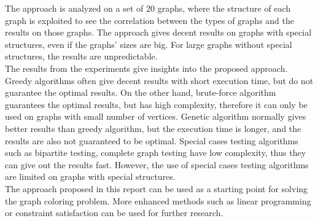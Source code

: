 \documentclass[a4paper]{report}
\begin{document}
	The approach is analyzed on a set of 20 graphs, where the structure of each graph is exploited to see the correlation between the types of graphs and the results on those graphs. The approach gives decent results on graphs with special structures, even if the graphs' sizes are big. For large graphs without special structures, the results are unpredictable. \\
	
	The results from the experiments give insights into the proposed approach. Greedy algorithms often give decent results with short execution time, but do not guarantee the optimal results. On the other hand, brute-force algorithm guarantees the optimal results, but has high complexity, therefore it can only be used on graphs with small number of vertices. Genetic algorithm normally gives better results than greedy algorithm, but the execution time is longer, and the results are also not guaranteed to be optimal. Special cases testing algorithms such as bipartite testing, complete graph testing have low complexity, thus they can give out the results fast. However, the use of special cases testing algorithms are limited on graphs with special structures. \\
	
	The approach proposed in this report can be used as a starting point for solving the graph coloring problem. More enhanced methods such as linear programming or constraint satisfaction can be used for further research.
	
	
	
	
\end{document}
